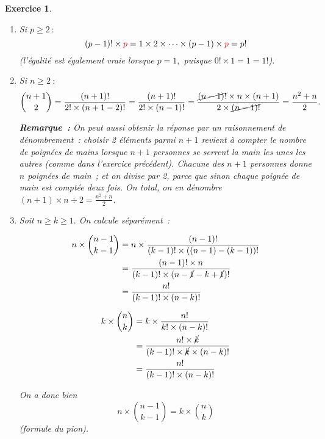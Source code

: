 \documentclass[10pt]{article}
\newtheorem{exo}{Exercice}
\begin{document}
\begin{exo}


\begin{enumerate}
\item Si $p\geq 2~:$ \[(p-1)!\times \textcolor{red}{p}=1\times 2\times\cdots\times (p-1)\times \textcolor{red}{p}=p!\]
(l'égalité est également vraie lorsque $p=1,$ puisque $0!\times 1=1=1!$).
\item Si $n\geq 2~:$ 
\[\binom{n+1}{2}=\frac{(n+1)!}{2!\times(n+1-2)!}=\frac{(n+1)!}{2!\times(n-1)!}=
\frac{\cancel{(n-1)!}\times n\times (n+1)}{2\times\cancel{(n-1)!}}=\frac{n^2+n}{2}.\]

\medskip

\textbf{Remarque~:} On peut aussi obtenir la réponse par un raisonnement de dénombrement~: choisir 2 éléments parmi $n+1$ revient à compter le nombre de poignées de mains lorsque $n+1$ personnes se serrent la main les unes les autres (comme dans l'exercice précédent). Chacune des $n+1$ personnes donne $n$ poignées de main~; et on divise par 2, parce que sinon chaque poignée de main est comptée deux fois. On total, on en dénombre $(n+1)\times n\div 2=\frac{n^2+n}{2}.$


\item Soit $n\geq k\geq 1.$ On calcule séparément~:

 \setlength{\columnseprule}{1pt}
\begin{multicols}{2}

\begin{align*}
n\times \binom{n-1}{k-1}
&=n\times \frac{(n-1)!}{(k-1)!\times((n-1)-(k-1))!}
\\&=\frac{(n-1)!\times n}{(k-1)!\times(n-\cancel{1}-k+\cancel{1})!}
\\&=\frac{n!}{(k-1)!\times(n-k)!}
\end{align*}

\begin{align*}
k\times \binom{n}{k}
&=k\times \frac{n!}{k!\times(n-k)!}
\\&=\frac{n!\times \cancel{k}}{(k-1)!\times \cancel{k}\times(n-k)!}
\\&=\frac{n!}{(k-1)!\times(n-k)!}
\end{align*}
\end{multicols}

\medskip

On a donc bien
\[n\times \binom{n-1}{k-1}=k\times \binom{n}{k}\] (formule du pion).
\end{enumerate}


\end{exo}
\end{document}
